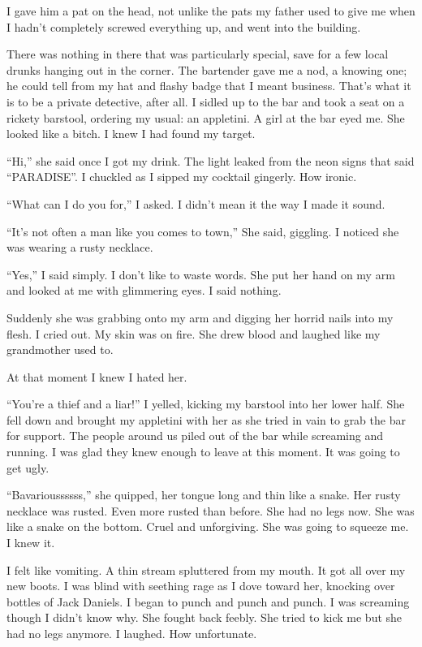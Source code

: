 I gave him a pat on the head, not unlike the pats my father used to
give me when I hadn't completely screwed everything up, and
went into the building.



There was nothing in there that was particularly special, save for
a few local drunks hanging out in the corner. The bartender gave me
a nod, a knowing one; he could tell from my hat and flashy badge
that I meant business. That's what it is to be a private
detective, after all. I sidled up to the bar and took a seat on a
rickety barstool, ordering my usual: an appletini. A girl at the
bar eyed me. She looked like a bitch. I knew I had found my
target.



``Hi,'' she said once I got my drink. The light leaked
from the neon signs that said ``PARADISE''. I chuckled as
I sipped my cocktail gingerly. How ironic.

``What can I do you for,'' I asked. I didn't mean
it the way I made it sound.

``It's not often a man like you comes to town,''
She said, giggling. I noticed she was wearing a rusty
necklace.

``Yes,'' I said simply. I don't like to waste
words. She put her hand on my arm and looked at me with glimmering
eyes. I said nothing.

Suddenly she was grabbing onto my arm and digging her horrid nails
into my flesh. I cried out. My skin was on fire. She drew blood and
laughed like my grandmother used to.

At that moment I knew I hated her.



``You're a thief and a liar!'' I yelled, kicking my
barstool into her lower half. She fell down and brought my
appletini with her as she tried in vain to grab the bar for
support. The people around us piled out of the bar while screaming
and running. I was glad they knew enough to leave at this moment.
It was going to get ugly.

``Bavarioussssss,'' she quipped, her tongue long and thin
like a snake. Her rusty necklace was rusted. Even more rusted than
before. She had no legs now. She was like a snake on the bottom.
Cruel and unforgiving. She was going to squeeze me. I knew
it.



I felt like vomiting. A thin stream spluttered from my mouth. It
got all over my new boots. I was blind with seething rage as I dove
toward her, knocking over bottles of Jack Daniels. I began to punch
and punch and punch. I was screaming though I didn't know
why. She fought back feebly. She tried to kick me but she had no
legs anymore. I laughed. How unfortunate.



